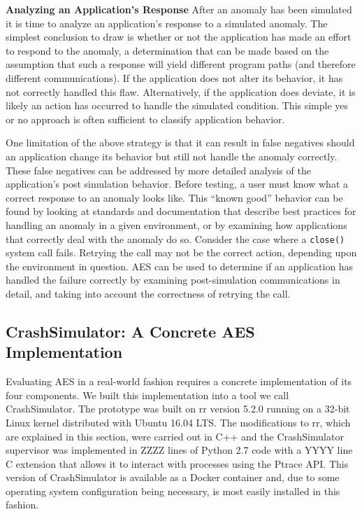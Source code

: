 \textbf{Analyzing an Application's Response}
After an anomaly has been simulated
it is time
to analyze an application's response
to a simulated anomaly.
The simplest conclusion to draw
is whether or not the application
has made an effort to respond
to the anomaly,
a determination that can be made based
on the assumption
that such a response will yield
different program paths (and therefore different communications).
If the application
does not alter its behavior, it has not
correctly handled this flaw.
Alternatively,
if the application does deviate,
it is likely
an action has occurred to handle the simulated condition.
This simple yes or no approach
is often sufficient
to classify application behavior.

One limitation of the above strategy
is that it can result in false negatives
should an application change its behavior
but still not handle the anomaly correctly.
These false negatives can be addressed
by more detailed analysis
of the application's post simulation behavior.
Before testing,
a user must know
what a correct response
to an anomaly looks like.
This ``known good'' behavior can be found
by looking at standards and documentation
that describe best practices for handling an anomaly
in a given environment,
or by examining how applications that correctly
deal with the anomaly do so.
Consider the case where a {\tt close()} system call fails.
Retrying the call may not be the correct action,
depending upon the environment in question.
AES can be used to determine if an application
has handled the failure correctly
by examining post-simulation communications in detail,
and taking into account the correctness of retrying the call.


\subsection{CrashSimulator: A Concrete AES Implementation}

Evaluating AES in a real-world fashion requires a
concrete implementation of its four components.
We built this implementation into a tool we call CrashSimulator.  The
prototype was built on rr version 5.2.0 running on a 32-bit Linux kernel
distributed with Ubuntu 16.04 LTS.  The modifications to rr, which are
explained in this section, were carried out in C++ and the CrashSimulator
supervisor was implemented in ZZZZ lines of Python 2.7 code with a YYYY
line C extension that allows it to interact with processes using the Ptrace
API.
This version of CrashSimulator is available as a Docker container and,
due to some operating system configuration being necessary, is most easily
installed in this fashion.

